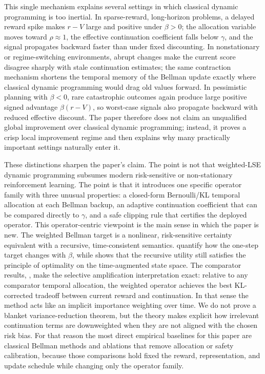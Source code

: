 \documentclass{article}
\theoremstyle{remark}
\begin{document}
This single mechanism explains several settings in which classical dynamic programming is too inertial. In sparse-reward, long-horizon problems, a delayed reward spike makes $r-V$ large and positive under $\beta>0$; the allocation variable moves toward $\rho\approx 1$, the effective continuation coefficient falls below $\gamma$, and the signal propagates backward faster than under fixed discounting. In nonstationary or regime-switching environments, abrupt changes make the current score disagree sharply with stale continuation estimates; the same contraction mechanism shortens the temporal memory of the Bellman update exactly where classical dynamic programming would drag old values forward. In pessimistic planning with $\beta<0$, rare catastrophic outcomes again produce large positive signed advantage $\beta(r-V)$, so worst-case signals also propagate backward with reduced effective discount. The paper therefore does not claim an unqualified global improvement over classical dynamic programming; instead, it proves a crisp local improvement regime and then explains why many practically important settings naturally enter it.

These distinctions sharpen the paper's claim. The point is not that weighted-LSE dynamic programming subsumes modern risk-sensitive or non-stationary reinforcement learning. The point is that it introduces one specific operator family with three unusual properties: a closed-form Bernoulli/KL temporal allocation at each Bellman backup, an adaptive continuation coefficient that can be compared directly to $\gamma$, and a safe clipping rule that certifies the deployed operator. This operator-centric viewpoint is the main sense in which the paper is new. The weighted Bellman target is a nonlinear, risk-sensitive certainty equivalent with a recursive, time-consistent semantics.  quantify how the one-step target changes with $\beta$, while  shows that the recursive utility still satisfies the principle of optimality on the time-augmented state space. The comparator results, , make the selective amplification interpretation exact: relative to any comparator temporal allocation, the weighted operator achieves the best KL-corrected tradeoff between current reward and continuation. In that sense the method acts like an implicit importance weighting over time. We do not prove a blanket variance-reduction theorem, but the theory makes explicit how irrelevant continuation terms are downweighted when they are not aligned with the chosen risk bias. For that reason the most direct empirical baselines for this paper are classical Bellman methods and ablations that remove allocation or safety calibration, because those comparisons hold fixed the reward, representation, and update schedule while changing only the operator family.
\end{document}
